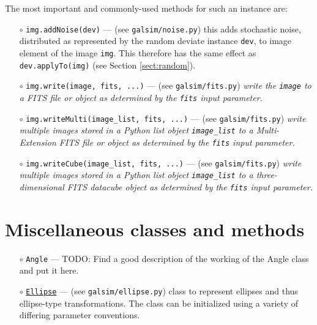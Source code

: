 \documentclass[preprint,11pt]{aastex}
\begin{document}
The most important and commonly-used methods for such an
instance are:
\begin{itemize}

\item[$\circ$] \texttt{img.addNoise(dev)} --- (see
  \texttt{galsim/noise.py}) this adds stochastic noise, distributed as
  represented by the random deviate instance \texttt{dev}, to image
  element of the image \texttt{img}.  This therefore has the same
  effect as \texttt{dev.applyTo(img)} (see Section \ref{sect:random}).

\item[$\circ$] \texttt{img.write(image, fits, ...)}  ---  (see
  \texttt{galsim/fits.py}) \emph{write the \texttt{image} to a FITS
    file or object as determined by the \texttt{fits} input parameter.}

\item[$\circ$] \texttt{img.writeMulti(image\_list, fits, ...)} ---   (see
  \texttt{galsim/fits.py}) \emph{write multiple images stored in a
  Python list object \texttt{image\_list} to a Multi-Extension FITS
  file or object as determined by the \texttt{fits} input parameter.}

\item[$\circ$] \texttt{img.writeCube(image\_list, fits, ...)} ---   (see
  \texttt{galsim/fits.py}) \emph{write multiple images stored in a
  Python list object \texttt{image\_list} to a three-dimensional FITS
  datacube object as determined by the \texttt{fits} input parameter.}

\end{itemize}

\section{Miscellaneous classes and methods}\label{sect:misc}

\begin{itemize}

\item[$\circ$] \texttt{Angle} --- TODO: Find a good description of the
  working of the Angle class and put it here.

\item[$\circ$] \href{http://galsim-developers.github.com/GalSim/classgalsim_1_1ellipse_1_1_ellipse.html}{\texttt{Ellipse}} --- (see \texttt{galsim/ellipse.py})
  class to represent ellipses and thus ellipse-type transformations.  
The class can be initialized using a variety of differing parameter conventions.

\end{itemize}
\end{document}
